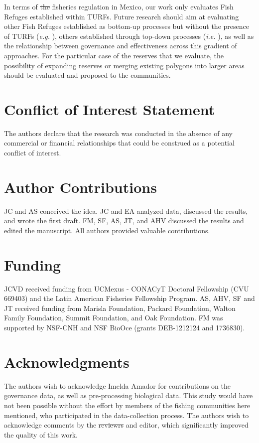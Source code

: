 \documentclass{frontiersSCNS}
\providecommand{\DIFaddtex}[1]{{\protect\color{blue}\uwave{#1}}} %
\providecommand{\DIFdeltex}[1]{{\protect\color{red}\sout{#1}}}                      %
\providecommand{\DIFaddbegin}{} %
\providecommand{\DIFaddend}{} %
\providecommand{\DIFdelbegin}{} %
\providecommand{\DIFdelend}{} %
\providecommand{\DIFadd}[1]{\texorpdfstring{\DIFaddtex{#1}}{#1}} %
\providecommand{\DIFdel}[1]{\texorpdfstring{\DIFdeltex{#1}}{}} %
\begin{document}
In terms of \DIFdelbegin \DIFdel{the }\DIFdelend fisheries regulation in Mexico, our work only evaluates Fish
Refuges established within TURFs. Future research should aim at
evaluating other Fish Refuges established as bottom-up processes but
without the presence of TURFs (\emph{e.g.} \citet{dof_websiteC_2012}),
others established through top-down processes (\emph{i.e.}
\citet{dof_websiteU_2018}), as well as the relationship between
governance and effectiveness across this gradient of approaches. For the
particular case of the reserves that we evaluate, the possibility of
expanding reserves or merging existing polygons into larger areas should
be evaluated and proposed to the communities.

\section*{Conflict of Interest Statement}

The authors declare that the research was conducted in the absence of
any commercial or financial relationships that could be construed as a
potential conflict of interest.

\section*{Author Contributions}

JC and AS conceived the idea. JC and EA analyzed data, discussed the
results, and wrote the first draft. FM, SF, AS, JT, and AHV discussed
the results and edited the manuscript. All authors provided valuable
contributions.

\section*{Funding}

JCVD received funding from UCMexus - CONACyT Doctoral Fellowship (CVU
669403) and the Latin American Fisheries Fellowship Program. AS, AHV, SF
and JT received funding from Marisla Foundation, Packard Foundation,
Walton Family Foundation, Summit Foundation, and Oak Foundation. FM was
supported by NSF-CNH and NSF BioOce (grants DEB-1212124 and 1736830).

\section*{Acknowledgments}

The authors wish to acknowledge Imelda Amador for contributions on the
governance data, as well as pre-processing biological data. This study
would have not been possible without the effort by members of the
fishing communities here mentioned, who participated in the
data-collection process. The authors wish to acknowledge comments by the
\DIFdelbegin \DIFdel{reviewrs }\DIFdelend \DIFaddbegin \DIFadd{reviewers }\DIFaddend and editor, which significantly improved the quality of this
work.
\end{document}
